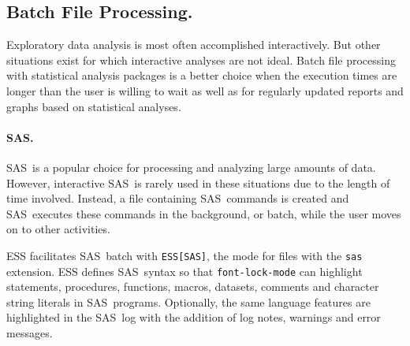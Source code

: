 \documentclass{article}
\newcommand*{\SAS}{\textsc{SAS}}
\newcommand{\stexttt}[1]{{\small\texttt{#1}}}
\begin{document}

\subsection{Batch File Processing.}
\label{sec:batch-file}

Exploratory data analysis is most often accomplished interactively.
But other situations exist for which interactive analyses are not
ideal. %
Batch file processing with statistical analysis packages is a better
choice when the execution times are longer than the user is willing to
wait as well as for regularly updated reports and graphs based on 
statistical analyses.

\paragraph{\SAS.}
\label{sec:sas-batch}

\SAS\ is a popular choice for processing and analyzing large amounts
of data.  However, interactive \SAS\ is rarely used in these situations
due to the length of time involved.  Instead, a file containing \SAS\ 
commands is created and \SAS\ executes these commands in the background, 
or batch, while the user moves on to other activities.

ESS facilitates \SAS\ batch with \stexttt{ESS[SAS]}, the mode for files
with the \stexttt{sas} extension.  ESS defines \SAS\ syntax so that
\stexttt{font-lock-mode} can highlight statements, procedures,
functions, macros, datasets, comments and character string literals in
\SAS\ programs.  Optionally, the same language features are
highlighted in the \SAS\ log with the addition of log notes, warnings
and error messages.
\end{document}
